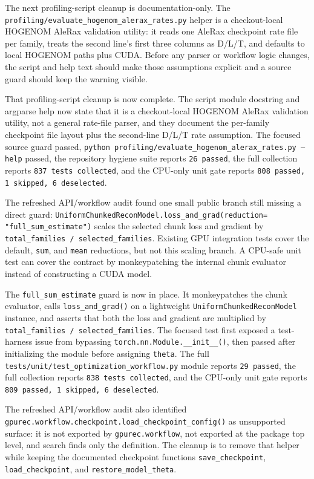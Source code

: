 \documentclass[11pt]{article}
\begin{document}
The next profiling-script cleanup is documentation-only.  The
\texttt{profiling/evaluate\_hogenom\_alerax\_rates.py} helper is a
checkout-local HOGENOM AleRax validation utility: it reads one AleRax checkpoint
rate file per family, treats the second line's first three columns as D/L/T,
and defaults to local HOGENOM paths plus CUDA.  Before any parser or workflow
logic changes, the script and help text should make those assumptions explicit
and a source guard should keep the warning visible.

That profiling-script cleanup is now complete.  The script module docstring and
argparse help now state that it is a checkout-local HOGENOM AleRax validation
utility, not a general rate-file parser, and they document the per-family
checkpoint file layout plus the second-line D/L/T rate assumption.  The focused
source guard passed, \texttt{python profiling/evaluate\_hogenom\_alerax\_rates.py
--help} passed, the repository hygiene suite reports \texttt{26 passed}, the
full collection reports \texttt{837 tests collected}, and the CPU-only unit
gate reports \texttt{808 passed, 1 skipped, 6 deselected}.

The refreshed API/workflow audit found one small public branch still missing a
direct guard: \texttt{UniformChunkedReconModel.loss\_and\_grad(reduction=
"full\_sum\_estimate")} scales the selected chunk loss and gradient by
\texttt{total\_families / selected\_families}.  Existing GPU integration tests
cover the default, \texttt{sum}, and \texttt{mean} reductions, but not this
scaling branch.  A CPU-safe unit test can cover the contract by monkeypatching
the internal chunk evaluator instead of constructing a CUDA model.

The \texttt{full\_sum\_estimate} guard is now in place.  It monkeypatches the
chunk evaluator, calls \texttt{loss\_and\_grad()} on a lightweight
\texttt{UniformChunkedReconModel} instance, and asserts that both the loss and
gradient are multiplied by \texttt{total\_families / selected\_families}.  The
focused test first exposed a test-harness issue from bypassing
\texttt{torch.nn.Module.\_\_init\_\_()}, then passed after initializing the
module before assigning \texttt{theta}.  The full
\texttt{tests/unit/test\_optimization\_workflow.py} module reports
\texttt{29 passed}, the full collection reports \texttt{838 tests collected},
and the CPU-only unit gate reports
\texttt{809 passed, 1 skipped, 6 deselected}.

The refreshed API/workflow audit also identified
\texttt{gpurec.workflow.checkpoint.load\_checkpoint\_config()} as unsupported
surface: it is not exported by \texttt{gpurec.workflow}, not exported at the
package top level, and search finds only the definition.  The cleanup is to
remove that helper while keeping the documented checkpoint functions
\texttt{save\_checkpoint}, \texttt{load\_checkpoint}, and
\texttt{restore\_model\_theta}.
\end{document}
